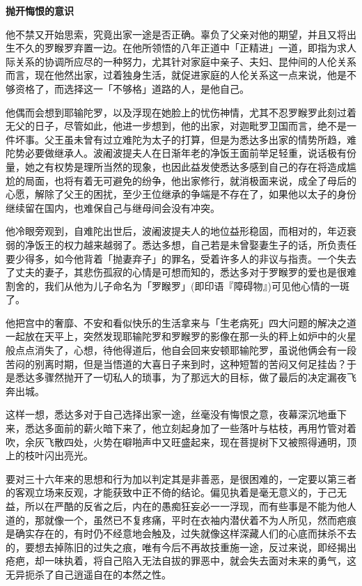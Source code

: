 \documentclass[twoside,openany]{book}
\newcommand{\mt}[1]{\textbullet \textbf{#1}}
\begin{document}
\mt{抛开悔恨的意识}

他不禁又开始思索，究竟出家一途是否正确。辜负了父亲对他的期望，并且又将出生不久的罗睺罗弃置一边。在他所领悟的八年正道中「正精进」一道，即指为求人际关系的协调所应尽的一种努力，尤其针对家庭中亲子、夫妇、昆仲间的人伦关系而言，现在他然出家，过着独身生活，就促进家庭的人伦关系这一点来说，他是不够资格了，而选择这一「不够格」道路的人，是他自己。

他偶而会想到耶输陀罗，以及浮现在她脸上的忧伤神情，尤其不忍罗睺罗此刻过着无父的日子，尽管如此，他进一步想到，他的出家，对迦毗罗卫国而言，绝不是一件坏事。父王虽未曾有过立难陀为太子的打算，但是为悉达多出家的情势所趋，难陀势必要做继承人。波阇波提夫人在日渐年老的净饭王面前举足轻重，说话极有份量，她之有权势是理所当然的现象，也因此益发使悉达多感到自己的存在将造成尴尬的局面，也将有着无可避免的纷争，他出家修行，就消极面来说，成全了母后的心愿，解除了父王的困扰，至少王位继承的争端是不存在了，如果他以太子的身份继续留在国内，也难保自己与继母间会没有冲突。

他冷眼旁观到，自难陀出世后，波阇波提夫人的地位益形稳固，而相对的，年迈衰弱的净饭王的权力越来越弱了。悉达多想，自己若是未曾娶妻生子的话，所负责任要少得多，如今他背着「抛妻弃子」的罪名，受着许多人的非议与指责。一个失去了丈夫的妻子，其悲伤孤寂的心情是可想而知的，悉达多对于罗睺罗的爱也是很难割舍的，我们从他为儿子命名为「罗睺罗」(即印语『障碍物』)可见他心情的一斑了。

他把宫中的奢靡、不安和看似快乐的生活拿来与「生老病死」四大问题的解决之道一起放在天平上，突然发现耶输陀罗和罗睺罗的影像在那一头的秤上如炉中的火星般点点消失了，心想，待他得道后，他自会回来安顿耶输陀罗，虽说他俩会有一段苦闷的别离时期，但是当悟道的大喜日子来到时，这种短暂的苦闷又何足挂齿？于是悉达多骤然抛开了一切私人的琐事，为了那远大的目标，做了最后的决定漏夜飞奔出城。

这样一想，悉达多对于自己选择出家一途，丝毫没有悔恨之意，夜幕深沉地垂下来，悉达多面前的薪火暗下来了，他立刻起身加了一些落叶与枯枝，再用竹管对着吹，余灰飞散四处，火势在噼啪声中又旺盛起来，现在菩提树下又被照得通明，顶上的枝叶闪出亮光。

要对三十六年来的思想和行为加以判定其是非善恶，是很困难的，一定要以第三者的客观立场来反观，才能获致中正不倚的结论。偏见执着是毫无意义的，于己无益，所以在严酷的反省之后，内在的愚痴狂妄必一一浮现，而有些事是不能为他人道的，那就像一个，虽然已不复疼痛，平时在衣袖内潜伏着不为人所见，然而疤痕是确实存在的，有时仍不经意地会触及，过失就像这样深藏人们的心底而抹杀不去的，要想去掉陈旧的过失之痕，唯有今后不再故技重施一途，反过来说，即经揭出疮疤，却一味执着，将自己陷入无法自拔的罪恶中，就会失去面对未来的勇气，这无异扼杀了自己逍遥自在的本然之性。
\end{document}
